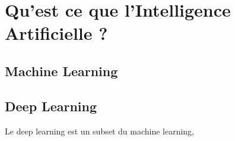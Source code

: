 
\chapter{Qu'est ce que l'Intelligence Artificielle ?}

\section{Machine Learning}


\section{Deep Learning}
Le deep learning est un subset du machine learning, 

\chapter{}